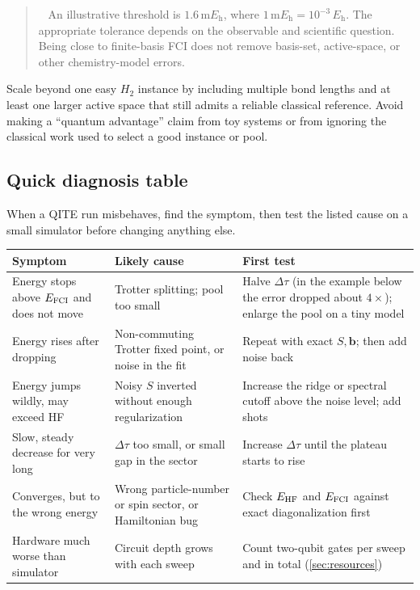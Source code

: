 \documentclass[11pt,a4paper]{article}
\newcommand{\dt}{\Delta\tau}
\newcommand{\Eh}{E_{\mathrm h}}
\newenvironment{idea}[1][Main idea]{\par\smallskip\begin{quotation}\noindent{\bfseries\textcolor{keyblue}{#1.}}\ }{\end{quotation}\smallskip}
\begin{document}
\begin{idea}[Choose a tolerance as a declared scientific target]
An illustrative threshold is $1.6\,\mathrm{m}\Eh$, where $1\,\mathrm{m}\Eh=10^{-3}\,\Eh$. The appropriate tolerance depends on the observable and scientific question. Being close to finite-basis FCI does not remove basis-set, active-space, or other chemistry-model errors.
\end{idea}

Scale beyond one easy $H_2$ instance by including multiple bond lengths and at least one larger active space that still admits a reliable classical reference. Avoid making a ``quantum advantage'' claim from toy systems or from ignoring the classical work used to select a good instance or pool.

\subsection*{Quick diagnosis table}
When a QITE run misbehaves, find the symptom, then test the listed cause on a small simulator before changing anything else.
\begin{center}
\small
\begin{tabularx}{\linewidth}{@{}p{3.3cm}p{4.6cm}X@{}}
\toprule
Symptom & Likely cause & First test\\\midrule
Energy stops above $E_{\rm FCI}$ and does not move & Trotter splitting; pool too small & Halve $\dt$ (in the example below the error dropped about $4\times$); enlarge the pool on a tiny model\\
Energy rises after dropping & Non-commuting Trotter fixed point, or noise in the fit & Repeat with exact $S,\bm b$; then add noise back\\
Energy jumps wildly, may exceed HF & Noisy $S$ inverted without enough regularization & Increase the ridge or spectral cutoff above the noise level; add shots\\
Slow, steady decrease for very long & $\dt$ too small, or small gap in the sector & Increase $\dt$ until the plateau starts to rise\\
Converges, but to the wrong energy & Wrong particle-number or spin sector, or Hamiltonian bug & Check $E_{\rm HF}$ and $E_{\rm FCI}$ against exact diagonalization first\\
Hardware much worse than simulator & Circuit depth grows with each sweep & Count two-qubit gates per sweep and in total (\cref{sec:resources})\\
\bottomrule
\end{tabularx}
\end{center}
\end{document}
